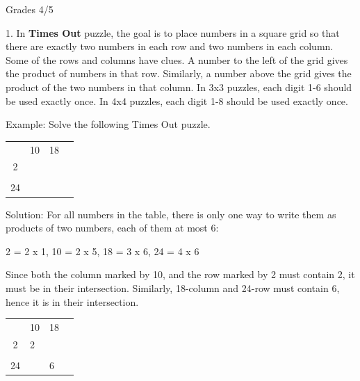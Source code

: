 \documentclass{article}
\begin{document}
\def\mca#1{\multicolumn{1}{c}{#1}}
\def\mcb#1{\multicolumn{1}{c|}{#1}}
\renewcommand{\arraystretch}{2.25}

\begin{center}
{\large Grades 4/5}
\end{center}

1. In {\bf Times Out} puzzle, the goal is to place numbers in a square grid so that there are exactly two numbers in each row and two numbers in each column. Some of the rows and columns have clues. A number to the left of the grid gives the product of numbers in that row. Similarly, a number above the grid gives the product of the two numbers in that column. In 3x3 puzzles, each digit 1-6 should be used exactly once. In 4x4 puzzles, each digit 1-8 should be used exactly once.
\vspace{3mm}

Example: Solve the following Times Out puzzle.

\begin{tabular}{p{5mm}|p{5mm}|p{5mm}|p{5mm}|}
  \mca{}  & \mca{10} & \mca{18} & \mca{} \\\cline{2-4}
  \mcb2   &     &    &     \\\cline{2-4}
  \mcb{}  &     &    &     \\\cline{2-4}
  \mcb{24} &    &    &     \\\cline{2-4}
\end{tabular}
\vspace{3mm}

Solution: For all numbers in the table, there is only one way to write them as products of two numbers, each of them at most 6:

2 = 2 x 1, 10 = 2 x 5, 18 = 3 x 6, 24 = 4 x 6

Since both the column marked by 10, and the row marked by 2 must contain 2, it must be in their intersection. Similarly, 18-column and 24-row must contain 6, hence it is in their intersection.

\begin{tabular}{p{5mm}|p{5mm}|p{5mm}|p{5mm}|}
  \mca{}  & \mca{10} & \mca{18} & \mca{} \\\cline{2-4}
  \mcb2   & 2  &    &     \\\cline{2-4}
  \mcb{}  &    &    &     \\\cline{2-4}
  \mcb{24} &   & 6  &     \\\cline{2-4}
\end{tabular}
\vspace{3mm}
\end{document}
